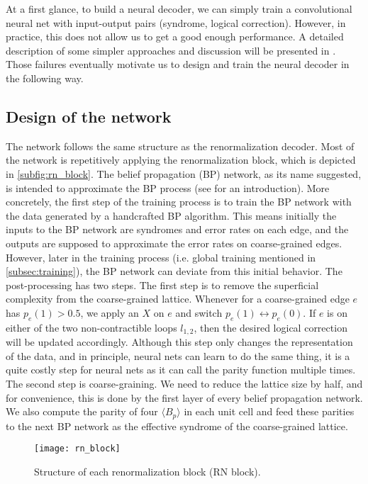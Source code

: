 At a first glance, to build a neural decoder, we can simply train a convolutional neural net with input-output pairs (syndrome, logical correction).
However, in practice, this does not allow us to get a good enough performance.
A detailed description of some simpler approaches and discussion will be presented in .
Those failures eventually motivate us to design and train the neural decoder in the following way.

\subsection{Design of the network}
\label{subsec:design_network}
The network follows the same structure as the renormalization decoder.
Most of the network is repetitively applying the renormalization block, which is depicted in \autoref{subfig:rn_block}.
The belief propagation (BP) network, as its name suggested, is intended to approximate the BP process (see  for an introduction).
More concretely, the first step of the training process is to train the BP network with the data generated by a handcrafted BP algorithm.
This means initially the inputs to the BP network are syndromes and error rates on each edge, and the outputs are supposed to approximate the error rates on coarse-grained edges.
However, later in the training process (i.e. global training mentioned in \autoref{subsec:training}), the BP network can deviate from this initial behavior.
The post-processing has two steps.
The first step is to remove the superficial complexity from the coarse-grained lattice.
Whenever for a coarse-grained edge $e$ has $p_e(1)>0.5$, we apply an $X$ on $e$ and switch $p_e(1) \leftrightarrow p_e(0)$.
If $e$ is on either of the two non-contractible loops $l_{1,2}$, then the desired logical correction will be updated accordingly.
Although this step only changes the representation of the data, and in principle, neural nets can learn to do the same thing, it is a quite costly step for neural nets as it can call the parity function multiple times.
The second step is coarse-graining.
We need to reduce the lattice size by half, and for convenience, this is done by the first layer of every belief propagation network.
We also compute the parity of four $\langle B_p \rangle$ in each unit cell and feed these parities to the next BP network as the effective syndrome of the coarse-grained lattice.

\begin{figure}

	\texttt{[image: rn\_block]}
	\caption{Structure of each renormalization block (RN block).}
	\label{subfig:rn_block}
\end{figure}

